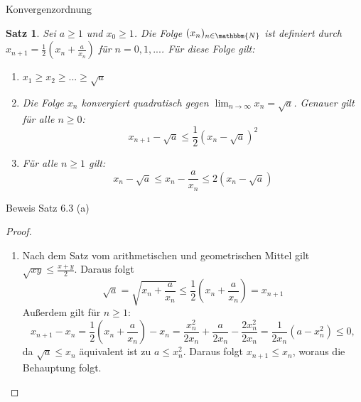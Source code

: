 \documentclass{beamer}
\newcommand{\N}{\mathbbm{N}} %
\newtheorem{satz}{Satz}[section]
\begin{document}
    \begin{frame}{Konvergenzordnung}
        \begin{satz}
          Sei $a \geq 1$ und $x_0 \geq 1$. Die Folge $(x_n)_{n \in \N}$ ist definiert durch $x_{n+1}= \frac{1}{2}\left(x_n+ \frac{a}{x_n}\right)$ für $n=0,1,...$. Für diese Folge gilt:
           \begin{enumerate}[(\alph*)]
           \item $x_1 \geq x_2 \geq ... \geq \sqrt{a}$
           \item Die Folge $x_n$ konvergiert quadratisch gegen $\lim_{n \to \infty} x_n= \sqrt{a}$. Genauer gilt für alle $n \geq0$:
            \begin{equation*}
            x_{n+1}- \sqrt{a} \leq \frac{1}{2}(x_n-\sqrt{a})^2
            \end{equation*}
       \item Für alle $n \geq 1$ gilt:
          \begin{equation*}
            x_n- \sqrt{a} \leq x_n - \frac{a}{x_n} \leq 2(x_n- \sqrt{a})
        \end{equation*}
       \end{enumerate}
     \end{satz}
    \end{frame}

    \begin{frame}{Beweis Satz 6.3 (a)}
        \begin{proof} 
    \begin{enumerate}[(\alph*)]
        \item Nach dem Satz vom arithmetischen und geometrischen Mittel gilt $\sqrt{xy} \leq \frac{x+y}{2}$. Daraus folgt
        \begin{equation*}
            \sqrt{a}= \sqrt{x_n+\frac{a}{x_n}} \leq \frac{1}{2} \left(x_n + \frac{a}{x_n}\right)=x_{n+1}
        \end{equation*}
        Außerdem gilt für $n\geq 1$:
        \begin{equation*}
            x_{n+1}-x_n= \frac{1}{2} \left(x_n+ \frac{a}{x_n} \right)-x_n= \frac{x_n^2}{2x_n}+ \frac{a}{2x_n}- \frac{2x_n^2}{2x_n}= \frac{1}{2x_n}(a-x_n^2)\leq0,
        \end{equation*}
        da $\sqrt{a} \leq x_n$ äquivalent ist zu $a \leq x_n^2$. Daraus folgt $x_{n+1} \leq x_n$, woraus die Behauptung folgt.
        \end{enumerate}
      \end{proof}
    \end{frame}
\end{document}
